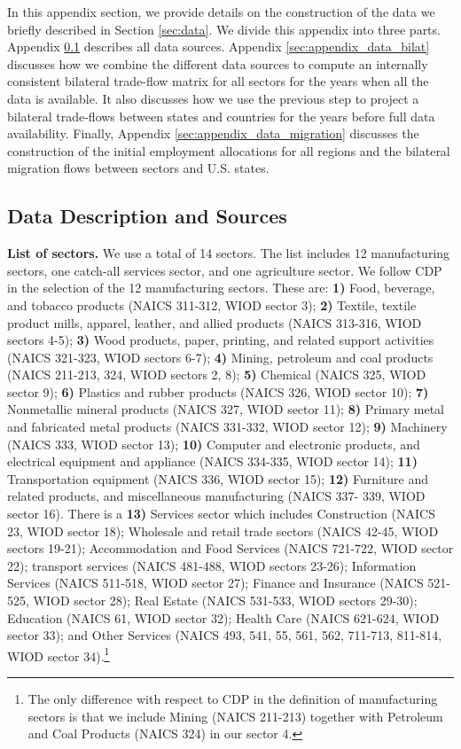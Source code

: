 \documentclass[12pt]{article}
\begin{document}
In this appendix section, we provide details on the construction of the data we briefly described in Section \ref{sec:data}. We divide this appendix into three parts. Appendix \ref{sec:appendix_data_sources} describes all data sources. Appendix \ref{sec:appendix_data_bilat} discusses how we combine the different data sources to compute an internally consistent bilateral trade-flow matrix for all sectors for the years when all the data is available. It also discusses how we use the previous step to project a bilateral trade-flows between states and countries for the years before full data availability. Finally, Appendix \ref{sec:appendix_data_migration} discusses the construction of the initial employment allocations for all regions and the  bilateral migration flows between sectors and U.S. states.

\subsection{Data Description and Sources}\label{sec:appendix_data_sources}

\textbf{List of sectors.} We use a total of 14 sectors. The list includes 12 manufacturing sectors, one catch-all services sector, and one agriculture sector. We follow CDP in the selection of the 12 manufacturing sectors. These are: \textbf{1)} Food, beverage, and tobacco products (NAICS 311-312, WIOD sector 3); \textbf{2)} Textile, textile product mills, apparel, leather, and allied products (NAICS 313-316, WIOD sectors 4-5); \textbf{3)} Wood products, paper, printing, and related support activities (NAICS 321-323, WIOD sectors 6-7); \textbf{4)} Mining, petroleum and coal products (NAICS 211-213, 324, WIOD sectors 2, 8); \textbf{5)} Chemical (NAICS 325, WIOD sector 9); \textbf{6)} Plastics and rubber products (NAICS 326, WIOD sector 10); \textbf{7)} Nonmetallic mineral products (NAICS 327, WIOD sector 11); \textbf{8)} Primary metal and fabricated metal products (NAICS 331-332, WIOD sector 12); \textbf{9)} Machinery (NAICS 333, WIOD sector 13); \textbf{10)} Computer and electronic products, and electrical equipment and appliance (NAICS 334-335, WIOD sector 14); \textbf{11)} Transportation equipment (NAICS 336, WIOD sector 15); \textbf{12)} Furniture and related products, and miscellaneous manufacturing (NAICS 337- 339, WIOD sector 16). There is a \textbf{13)} Services sector which includes Construction (NAICS 23, WIOD sector 18); Wholesale and retail trade sectors (NAICS 42-45, WIOD sectors 19-21); Accommodation and Food Services (NAICS 721-722, WIOD sector 22); transport services (NAICS 481-488, WIOD sectors 23-26); Information Services (NAICS 511-518, WIOD sector 27); Finance and Insurance (NAICS 521-525, WIOD sector 28); Real Estate (NAICS 531-533, WIOD sectors 29-30); Education (NAICS 61, WIOD sector 32); Health Care (NAICS 621-624, WIOD sector 33); and  Other Services (NAICS 493, 541, 55, 561, 562, 711-713, 811-814, WIOD sector 34).\footnote{The only difference with respect to CDP in the definition of manufacturing sectors is that we include Mining (NAICS 211-213) together with Petroleum and Coal Products (NAICS 324) in our sector 4.}
\end{document}
